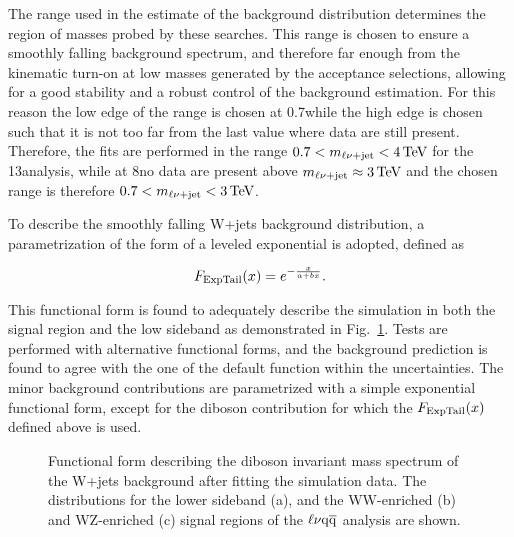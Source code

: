 The \mlvj range used in the estimate of the background distribution determines the region of masses probed by these searches.
This range is chosen to ensure a smoothly falling background spectrum, and therefore far enough from the kinematic turn-on at low masses generated by the acceptance selections,
allowing for a good stability and a robust control of the background estimation.
For this reason the low edge of the range is chosen at 0.7\TeV while the high edge is chosen such that it is not too far from the last value where data are still present.
Therefore, the fits are performed in the range $0.7 < m_{\ell\nu+{\rm jet}} < 4\,\text{Te\hspace{-.08em}V}$ for the 13\TeV analysis, while at 8\TeV no data are present above $m_{\ell\nu+{\rm jet}} \approx 3\,\text{Te\hspace{-.08em}V}$ and the chosen range is therefore $0.7 < m_{\ell\nu+{\rm jet}} < 3\,\text{Te\hspace{-.08em}V}$.

To describe the smoothly falling W+jets background distribution, a parametrization of the form of a leveled exponential is adopted, defined as

\begin{equation}\label{eqn:mVVfunct}
   F_{\rm ExpTail}(x) = e^{-\frac{x}{a+bx}}.
\end{equation}

This functional form is found to adequately describe the simulation in both the signal region and the low sideband as demonstrated in Fig.~\ref{fig:mcfits_mlvj}. Tests are performed with alternative functional forms, and the background prediction is found to agree with the one of the default function within the uncertainties.
The minor background contributions are parametrized with a simple exponential functional form, except for the diboson contribution for which the $F_{\rm ExpTail}(x)$ defined above is used.

\begin{figure}[!htb]
\centering
{}
\caption{Functional form describing the diboson invariant mass spectrum of the W+jets background after fitting the simulation data. The distributions for the lower \mJ sideband (a), and the WW-enriched (b) and WZ-enriched (c) signal regions of the $\ell\nu\mathrm{q}\overline{\mathrm{q}}$ analysis are shown.}
\label{fig:mcfits_mlvj}
\end{figure}

